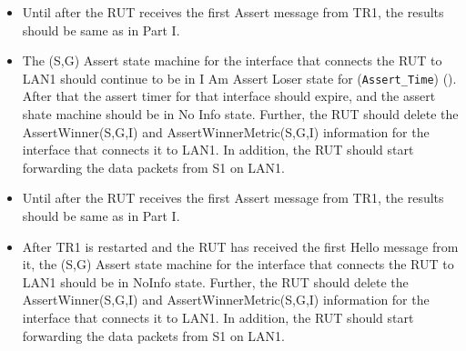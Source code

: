 \documentclass[11pt]{report}
\begin{document}

\begin{itemize}

  \item Until after the RUT receives the first Assert message from TR1, the
  results should be same as in Part I.

  \item The (S,G) Assert state machine for the interface that connects the RUT
  to LAN1 should continue to be in I Am Assert Loser state for
  (\verb=Assert_Time=) ({\PimsmAssertTime}). After that the assert timer for
  that interface should expire, and the assert shate machine should be in No
  Info state.
  Further, the RUT should delete the AssertWinner(S,G,I) and
  AssertWinnerMetric(S,G,I) information for the interface that connects it to
  LAN1.
  In addition, the RUT should start forwarding the data packets from S1 on
  LAN1.

\end{itemize}


\begin{itemize}

  \item Until after the RUT receives the first Assert message from TR1, the
  results should be same as in Part I.

  \item After TR1 is restarted and the RUT has received the first Hello
  message from it, the (S,G) Assert state machine for the
  interface that connects the RUT to LAN1 should be in NoInfo state.
  Further, the RUT should delete the AssertWinner(S,G,I) and
  AssertWinnerMetric(S,G,I) information for the interface that connects it to
  LAN1.
  In addition, the RUT should start forwarding the data packets from S1 on
  LAN1.

\end{itemize}

\end{document}
